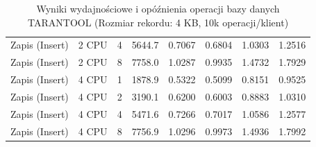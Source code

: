 \begin{table}[ht]
{\begin{tabular}{llcrrrrr}
Zapis (Insert) & 2 CPU & 4 & 5644.7 & 0.7067 & 0.6804 & 1.0303 & 1.2516 \\
Zapis (Insert) & 2 CPU & 8 & 7758.0 & 1.0287 & 0.9935 & 1.4732 & 1.7929 \\
Zapis (Insert) & 4 CPU & 1 & 1878.9 & 0.5322 & 0.5099 & 0.8151 & 0.9525 \\
Zapis (Insert) & 4 CPU & 2 & 3190.1 & 0.6200 & 0.6003 & 0.8883 & 1.0310 \\
Zapis (Insert) & 4 CPU & 4 & 5471.6 & 0.7266 & 0.7017 & 1.0586 & 1.2577 \\
Zapis (Insert) & 4 CPU & 8 & 7756.9 & 1.0296 & 0.9973 & 1.4936 & 1.7992 \\
\bottomrule
\end{tabular}%
}
\caption{Wyniki wydajnościowe i opóźnienia operacji bazy danych TARANTOOL (Rozmiar rekordu: 4 KB, 10k operacji/klient)}
\label{tab:latency_tarantool_medium_10000}
\end{table}
